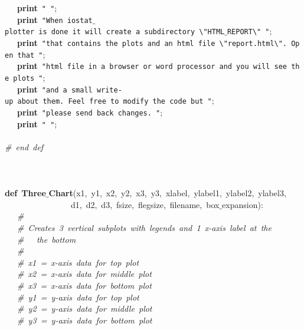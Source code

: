 \mbox{}\ \ \ \textbf{print}\ \texttt{"{}\ "{}}; \\
\mbox{}\ \ \ \textbf{print}\ \texttt{"{}When\ iostat$\_$plotter\ is\ done\ it\ will\ create\ a\ subdirectory\ \textbackslash{}"{}HTML$\_$REPORT\textbackslash{}"{}\ "{}}; \\
\mbox{}\ \ \ \textbf{print}\ \texttt{"{}that\ contains\ the\ plots\ and\ an\ html\ file\ \textbackslash{}"{}report.html\textbackslash{}"{}.\ Open\ that\ "{}}; \\
\mbox{}\ \ \ \textbf{print}\ \texttt{"{}html\ file\ in\ a\ browser\ or\ word\ processor\ and\ you\ will\ see\ the\ plots\ "{}}; \\
\mbox{}\ \ \ \textbf{print}\ \texttt{"{}and\ a\ small\ write-up\ about\ them.\ Feel\ free\ to\ modify\ the\ code\ but\ "{}}; \\
\mbox{}\ \ \ \textbf{print}\ \texttt{"{}please\ send\ back\ changes.\ "{}}; \\
\mbox{}\ \ \ \textbf{print}\ \texttt{"{}\ "{}}; \\
\mbox{} \\
\mbox{}\textit{\#\ end\ def} \\
\mbox{} \\
\mbox{} \\
\mbox{} \\
\mbox{}\textbf{def}\ \textbf{Three$\_$Chart}(x1,\ y1,\ x2,\ y2,\ x3,\ y3,\ xlabel,\ ylabel1,\ ylabel2,\ ylabel3,\  \\
\mbox{}\ \ \ \ \ \ \ \ \ \ \ \ \ \ \ \ d1,\ d2,\ d3,\ fsize,\ flegsize,\ filename,\ box$\_$expansion): \\
\mbox{}\ \ \ \textit{\#} \\
\mbox{}\ \ \ \textit{\#\ Creates\ 3\ vertical\ subplots\ with\ legends\ and\ 1\ x-axis\ label\ at\ the} \\
\mbox{}\ \ \ \textit{\#\ \ \ the\ bottom} \\
\mbox{}\ \ \ \textit{\#} \\
\mbox{}\ \ \ \textit{\#\ x1\ =\ x-axis\ data\ for\ top\ plot} \\
\mbox{}\ \ \ \textit{\#\ x2\ =\ x-axis\ data\ for\ middle\ plot} \\
\mbox{}\ \ \ \textit{\#\ x3\ =\ x-axis\ data\ for\ bottom\ plot} \\
\mbox{}\ \ \ \textit{\#\ y1\ =\ y-axis\ data\ for\ top\ plot} \\
\mbox{}\ \ \ \textit{\#\ y2\ =\ y-axis\ data\ for\ middle\ plot} \\
\mbox{}\ \ \ \textit{\#\ y3\ =\ y-axis\ data\ for\ bottom\ plot} \\
